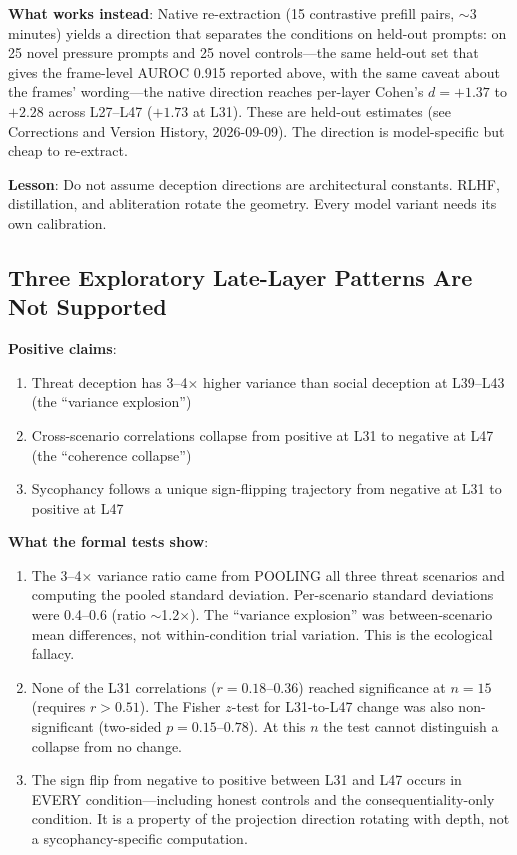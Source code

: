 \documentclass[11pt,letterpaper]{article}
\begin{document}
\textbf{What works instead}: Native re-extraction (15 contrastive prefill pairs, $\sim$3 minutes)
yields a direction that separates the conditions on held-out prompts: on 25 novel pressure prompts
and 25 novel controls---the same held-out set that gives the frame-level AUROC 0.915 reported
above, with the same caveat about the frames' wording---the native direction reaches per-layer
Cohen's $d = +1.37$ to $+2.28$ across L27--L47 ($+1.73$ at L31). These are held-out estimates (see
Corrections and Version History, 2026-09-09). The direction is model-specific but cheap to
re-extract.

\textbf{Lesson}: Do not assume deception directions are architectural constants. RLHF, distillation,
and abliteration rotate the geometry. Every model variant needs its own calibration.

\subsection{Three Exploratory Late-Layer Patterns Are Not Supported}\label{sec:artifacts}

\textbf{Positive claims}:
\begin{enumerate}[label=\arabic*.]
  \item Threat deception has 3--4$\times$ higher variance than social deception at L39--L43 (the
    ``variance explosion'')
  \item Cross-scenario correlations collapse from positive at L31 to negative at L47 (the
    ``coherence collapse'')
  \item Sycophancy follows a unique sign-flipping trajectory from negative at L31 to positive at L47
\end{enumerate}

\textbf{What the formal tests show}:
\begin{enumerate}[label=\arabic*.]
  \item The 3--4$\times$ variance ratio came from POOLING all three threat scenarios and computing
    the pooled standard deviation. Per-scenario standard deviations were 0.4--0.6 (ratio $\sim$1.2$\times$).
    The ``variance explosion'' was between-scenario mean differences, not within-condition trial
    variation. This is the ecological fallacy.
  \item None of the L31 correlations ($r = 0.18$--$0.36$) reached significance at $n=15$ (requires
    $r > 0.51$). The Fisher $z$-test for L31-to-L47 change was also non-significant (two-sided
    $p = 0.15$--$0.78$). At this $n$ the test cannot distinguish a collapse from no change.
  \item The sign flip from negative to positive between L31 and L47 occurs in EVERY condition---including
    honest controls and the consequentiality-only condition. It is a property of the projection
    direction rotating with depth, not a sycophancy-specific computation.
\end{enumerate}
\end{document}
